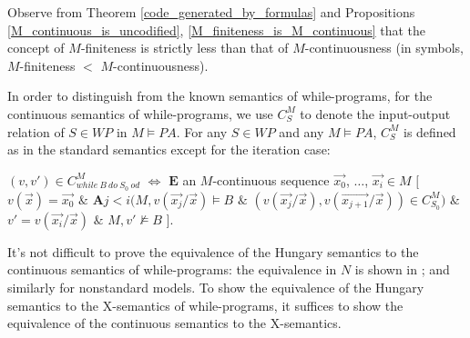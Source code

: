 \documentclass[a4paper,11pt]{article}
\begin{document}
Observe from Theorem \ref{code_generated_by_formulas} and Propositions \ref{M_continuous_is_uncodified}, \ref{M_finiteness_is_M_continuous} that the concept of $M$-finiteness is strictly less than that of $M$-continuousness (in symbols, $M$-finiteness $<$ $M$-continuousness).

In order to distinguish from the known semantics of while-programs, for the continuous semantics of while-programs, we use $C_S^M$ to denote the input-output relation of $S\in WP$ in $M\models PA$. For any $S\in WP$ and any $M\models PA$, $C_S^M$ is defined as in the standard semantics except for the iteration case:

$(v,v')\in C_{while\ B\ do\ S_0\ od}^M$ $\Leftrightarrow$ $\textbf{E}$ an $M$-continuous sequence $\vec{x_0}$, $\ldots$, $\vec{x_i} \in M$ $[$ $v(\vec{x}) = \vec{x_0}$ $\&$ $\textbf{A} j < i ( M,v(\vec{x_j}/\vec{x})\models B$ $\&$ $(v(\vec{x_j}/\vec{x}), v(\vec{x_{j+1}}/\vec{x}))\in C_{S_0}^M ) $ $\&$ $v' = v(\vec{x_i}/\vec{x})$ $\&$ $M,v'\not\models B$ $]$.

It's not difficult to prove the equivalence of the Hungary semantics to the continuous semantics of while-programs: the equivalence in $N$ is shown in \cite[Section 3-3.1]{manna_1}; and similarly for nonstandard models. To show the equivalence of the Hungary semantics to the X-semantics of while-programs, it suffices to show the equivalence of the continuous semantics to the X-semantics.
\end{document}
